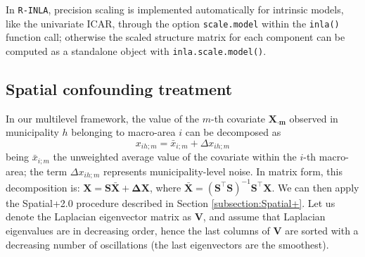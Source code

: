 \documentclass[openany, 11pt, oneside]{book}
\begin{document}
In \texttt{R-INLA}, precision scaling is implemented automatically for intrinsic models, like the univariate ICAR, through the option \texttt{scale.model} within the \texttt{inla()} function call; otherwise the scaled structure matrix for each component can be computed as a standalone object with \texttt{inla.scale.model()}. %

\subsection{Spatial confounding treatment}


In our multilevel framework, the value of the $m$-th covariate $\boldsymbol{X_{\cdot m}}$ observed in municipality $h$ belonging to macro-area $i$ can be decomposed as
$$
x_{ih;m} = \bar{x}_{i;m} + \Delta x_{ih;m}
$$
being $\bar{x}_{i;m}$ the unweighted average value of the covariate within the $i$-th macro-area; the term $\Delta x_{ih;m}$ represents municipality-level noise. In matrix form, this decomposition is: $\boldsymbol{X}= \boldsymbol{S} \bar{\boldsymbol{X}} + \boldsymbol{\Delta X}$, where $\bar{\boldsymbol{X}} = (\boldsymbol{S} ^{\top} \boldsymbol{S})^{-1} \boldsymbol{S}^{\top} \boldsymbol{X}$.
We can then apply the Spatial+2.0 procedure \parencite{Urdangarin24} described in Section \ref{subsection:Spatial+}. Let us denote the Laplacian eigenvector matrix as $\boldsymbol{V}$, and assume that Laplacian eigenvalues are in decreasing order, hence the last columns of $\boldsymbol{V}$ are sorted with a decreasing number of oscillations (the last eigenvectors are the smoothest).
%
\end{document}
